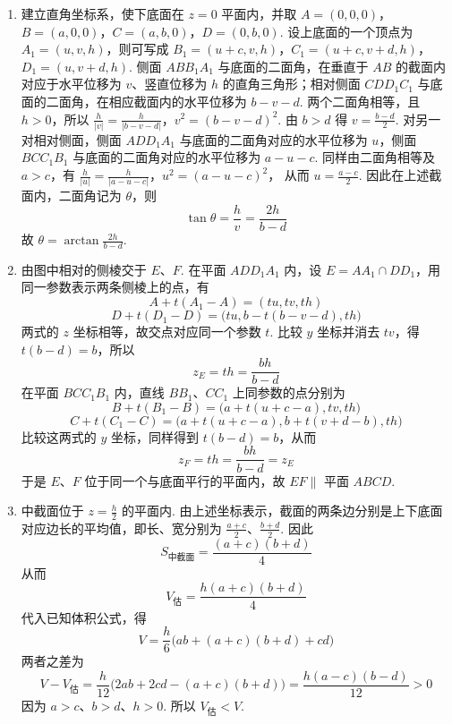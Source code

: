 \begin{problem}
\begin{solution}
\begin{enumerate}
\item 建立直角坐标系，使下底面在 \(z=0\) 平面内，并取 \(A=(0,0,0)\)，\(B=(a,0,0)\)，\(C=(a,b,0)\)，\(D=(0,b,0)\).
设上底面的一个顶点为 \(A_{1}=(u,v,h)\)，则可写成 \(B_{1}=(u+c,v,h)\)，\(C_{1}=(u+c,v+d,h)\)，\(D_{1}=(u,v+d,h)\).
侧面 \(ABB_{1}A_{1}\) 与底面的二面角，在垂直于 \(AB\) 的截面内对应于水平位移为 \(v\)、竖直位移为 \(h\) 的直角三角形；相对侧面 \(CDD_{1}C_{1}\) 与底面的二面角，在相应截面内的水平位移为 \(b-v-d\). 两个二面角相等，且 \(h>0\)，所以
\(\frac{h}{|v|}=\frac{h}{|b-v-d|}\)，\(v^{2}=(b-v-d)^{2}\).
由 \(b>d\) 得 \(v=\frac{b-d}{2}\). 对另一对相对侧面，侧面 \(ADD_{1}A_{1}\) 与底面的二面角对应的水平位移为 \(u\)，侧面 \(BCC_{1}B_{1}\) 与底面的二面角对应的水平位移为 \(a-u-c\). 同样由二面角相等及 \(a>c\)，有
\(\frac{h}{|u|}=\frac{h}{|a-u-c|}\)，\(u^{2}=(a-u-c)^{2}\)，
从而 \(u=\frac{a-c}{2}\). 因此在上述截面内，二面角记为 \(\theta\)，则
\[
\tan\theta=\frac{h}{v}=\frac{2h}{b-d}
\]
故 \(\theta=\arctan\frac{2h}{b-d}\).
\item 由图中相对的侧棱交于 \(E\)、\(F\). 在平面 \(ADD_{1}A_{1}\) 内，设 \(E=A A_{1}\cap D D_{1}\)，用同一参数表示两条侧棱上的点，有
\[
A+t(A_{1}-A)=(tu,tv,th)
\]
\[
D+t(D_{1}-D)=\bigl(tu,b-t(b-v-d),th\bigr)
\]
两式的 \(z\) 坐标相等，故交点对应同一个参数 \(t\). 比较 \(y\) 坐标并消去 \(tv\)，得 \(t(b-d)=b\)，所以
\[
z_{E}=th=\frac{bh}{b-d}
\]
在平面 \(BCC_{1}B_{1}\) 内，直线 \(BB_{1}\)、\(CC_{1}\) 上同参数的点分别为
\[
B+t(B_{1}-B)=\bigl(a+t(u+c-a),tv,th\bigr)
\]
\[
C+t(C_{1}-C)=\bigl(a+t(u+c-a),b+t(v+d-b),th\bigr)
\]
比较这两式的 \(y\) 坐标，同样得到 \(t(b-d)=b\)，从而
\[
z_{F}=th=\frac{bh}{b-d}=z_{E}
\]
于是 \(E\)、\(F\) 位于同一个与底面平行的平面内，故 \(EF\parallel\) 平面 \(ABCD\).
\item 中截面位于 \(z=\frac{h}{2}\) 的平面内. 由上述坐标表示，截面的两条边分别是上下底面对应边长的平均值，即长、宽分别为 \(\frac{a+c}{2}\)、\(\frac{b+d}{2}\). 因此
\[
S_{\text{中截面}}=\frac{(a+c)(b+d)}{4}
\]
从而
\[
V_{\text{估}}=\frac{h(a+c)(b+d)}{4}
\]
代入已知体积公式，得
\[
V=\frac{h}{6}\bigl(ab+(a+c)(b+d)+cd\bigr)
\]
两者之差为
\[
V-V_{\text{估}}=\frac{h}{12}\bigl(2ab+2cd-(a+c)(b+d)\bigr)=\frac{h(a-c)(b-d)}{12}>0
\]
因为 \(a>c\)、\(b>d\)、\(h>0\). 所以 \(V_{\text{估}}<V\).
\end{enumerate}
\end{solution}
\end{problem}

